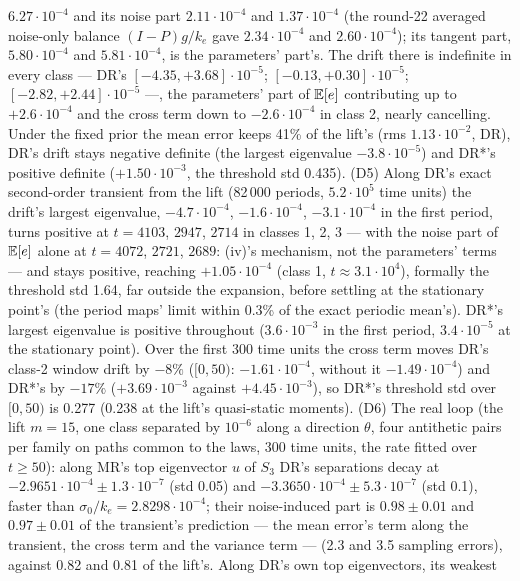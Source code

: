 \begin{sloppypar}
$6.27\cdot10^{-4}$ and its noise part $2.11\cdot10^{-4}$ and $1.37\cdot10^{-4}$ (the round-22 averaged noise-only
balance $(I - P)g/k_e$ gave $2.34\cdot10^{-4}$ and $2.60\cdot10^{-4}$); its tangent part, $5.80\cdot10^{-4}$ and
$5.81\cdot10^{-4}$, is the parameters' part's. The drift there is indefinite in every class --- DR's
$[-4.35,+3.68]\cdot10^{-5}$; $[-0.13,+0.30]\cdot10^{-5}$; $[-2.82,+2.44]\cdot10^{-5}$ ---, the parameters' part of
$\mathbb{E}[e]$ contributing up to $+2.6\cdot10^{-4}$ and the cross term down to $-2.6\cdot10^{-4}$ in class 2, nearly
cancelling. Under the fixed prior the mean error keeps 41\% of the lift's (rms $1.13\cdot10^{-2}$, DR), DR's drift
stays negative definite (the largest eigenvalue $-3.8\cdot10^{-5}$) and DR*'s positive definite
($+1.50\cdot10^{-3}$, the threshold std 0.435). (D5) Along DR's exact second-order transient from the lift (82\,000
periods, $5.2\cdot10^5$ time units) the drift's largest eigenvalue, $-4.7\cdot10^{-4}$, $-1.6\cdot10^{-4}$,
$-3.1\cdot10^{-4}$ in the first period, turns positive at $t = 4103$, $2947$, $2714$ in classes 1, 2, 3 --- with the
noise part of $\mathbb{E}[e]$ alone at $t = 4072$, $2721$, $2689$: (iv)'s mechanism, not the parameters' terms --- and stays
positive, reaching $+1.05\cdot10^{-4}$ (class 1, $t\approx3.1\cdot10^4$), formally the threshold std 1.64, far
outside the expansion, before settling at the stationary point's (the period maps' limit within 0.3\% of the exact
periodic mean's). DR*'s largest eigenvalue is positive throughout ($3.6\cdot10^{-3}$ in the first period,
$3.4\cdot10^{-5}$ at the stationary point). Over the first 300 time units the cross term moves DR's class-2 window
drift by $-8\%$ ($[0,50)$: $-1.61\cdot10^{-4}$, without it $-1.49\cdot10^{-4}$) and DR*'s by $-17\%$
($+3.69\cdot10^{-3}$ against $+4.45\cdot10^{-3}$), so DR*'s threshold std over $[0,50)$ is 0.277 (0.238 at the lift's
quasi-static moments). (D6) The real loop (the lift $m = 15$, one class separated by $10^{-6}$ along a direction
$\theta$, four antithetic pairs per family on paths common to the laws, 300 time units, the rate fitted over
$t\ge50$): along MR's top eigenvector $u$ of $S_3$ DR's separations decay at
$-2.9651\cdot10^{-4}\pm1.3\cdot10^{-7}$ (std 0.05) and $-3.3650\cdot10^{-4}\pm5.3\cdot10^{-7}$ (std 0.1), faster
than $\sigma_0/k_e = 2.8298\cdot10^{-4}$; their noise-induced part is $0.98\pm0.01$ and $0.97\pm0.01$ of the
transient's prediction --- the mean error's term along the transient, the cross term and the variance term --- (2.3
and 3.5 sampling errors), against 0.82 and 0.81 of the lift's. Along DR's own top eigenvectors, its weakest

\end{sloppypar}
